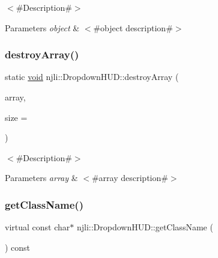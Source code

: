$<$\#\+Description\#$>$


\begin{DoxyParams}{Parameters}
{\em object} & $<$\#object description\#$>$ \\
\hline
\end{DoxyParams}
\mbox{\label{classnjli_1_1_dropdown_h_u_d_ad05de3f92cb4b4416336bef15656f50e}} 
\subsubsection{\texorpdfstring{destroy\+Array()}{destroyArray()}}
{\footnotesize\ttfamily static \mbox{\hyperlink{_thread_8h_af1e856da2e658414cb2456cb6f7ebc66}{void}} njli\+::\+Dropdown\+H\+U\+D\+::destroy\+Array (\begin{DoxyParamCaption}\item[{\mbox{\hyperlink{classnjli_1_1_dropdown_h_u_d}{Dropdown\+H\+UD}} $\ast$$\ast$}]{array,  }\item[{const \mbox{\hyperlink{_util_8h_a10e94b422ef0c20dcdec20d31a1f5049}{u32}}}]{size = {} }\end{DoxyParamCaption})\hspace{0.3cm}{\ttfamily [static]}}

$<$\#\+Description\#$>$


\begin{DoxyParams}{Parameters}
{\em array} & $<$\#array description\#$>$ \\
\hline
\end{DoxyParams}
\mbox{\label{classnjli_1_1_dropdown_h_u_d_a202580d3713b77451e35589143df3638}} 
\subsubsection{\texorpdfstring{get\+Class\+Name()}{getClassName()}}
{\footnotesize\ttfamily virtual const char$\ast$ njli\+::\+Dropdown\+H\+U\+D\+::get\+Class\+Name (\begin{DoxyParamCaption}{ }\end{DoxyParamCaption}) const\hspace{0.3cm}{\ttfamily [virtual]}}

